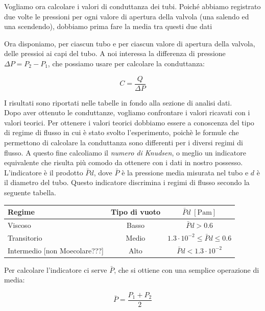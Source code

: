 Vogliamo ora calcolare i valori di conduttanza dei tubi. Poiché abbiamo registrato due volte le pressioni per ogni valore
di apertura della valvola (una salendo ed una scendendo), dobbiamo prima fare la media tra questi due dati

Ora disponiamo, per ciascun tubo e per ciascun valore di apertura della valvola, delle pressioi ai capi del tubo.
A noi interessa la differenza di pressione $\Delta P = P_2 - P_1$, che possiamo usare per calcolare la conduttanza:

\begin{equation}
    C = \frac{Q}{\Delta P}
\end{equation}

I risultati sono riportati nelle tabelle in fondo alla sezione di analisi dati.\\
Dopo aver ottenuto le conduttanze, vogliamo confrontare i valori ricavati con i valori teorici.
Per ottenere i valori teorici dobbiamo essere a conoscenza del tipo di regime di flusso in cui è stato svolto l'esperimento,
poichè le formule che permettono di calcolare la conduttanza sono differenti per i diversi regimi di flusso.
A questo fine calcoliamo il \emph{numero di Knudsen}, o meglio un indicatore equivalente che risulta più comodo da
ottenere con i dati in nostro possesso. L'indicatore è il prodotto $\bar{P}d$, dove $\bar{P}$ è la pressione media misurata nel
tubo e $d$ è il diametro del tubo. Questo indicatore discrimina i regimi di flusso secondo la seguente tabella.

\begin{center}
    \begin{tabular}{l c c}
        \toprule
        Regime & Tipo di vuoto & $\bar{P} d \; [\si{\pascal\metre}]$ \\
        \midrule
        Viscoso & Basso & $\bar{P} d > 0.6$ \\
        Transitorio & Medio & $1.3\cdot10^{-2} \le \bar{P} d \le 0.6$ \\
        Intermedio [non Moecolare???] & Alto & $\bar{P} d < 1.3\cdot10^{-2}$ \\
        \bottomrule
    \end{tabular}
\end{center}

Per calcolare l'indicatore ci serve $\bar{P}$, che si ottiene con una semplice operazione di media:

\begin{equation}
    \bar{P} = \frac{P_1 + P_2}{2}
\end{equation}

